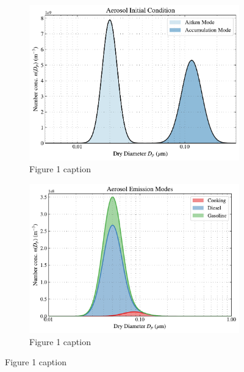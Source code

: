 \documentclass{article}
\begin{document}
\begin{figure}
  \centering
  \begin{subfigure}
    \centering
    \includegraphics[width=\textwidth]{figures/urban-plume-aerosol-ic.pdf}
    \caption{Figure 1 caption}
    \label{fig:sub1}
  \end{subfigure}
   \vspace*{5mm}  %
  \begin{subfigure}
    \centering
    \includegraphics[width=\textwidth]{figures/urban-plume-aerosol-emissions.pdf}
    \caption{Figure 1 caption}
    \label{fig:sub1}
  \end{subfigure}
\end{figure}
\end{document}
